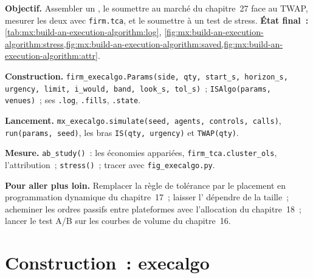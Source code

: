\begin{tutorial}
\textbf{Objectif.} Assembler un , le soumettre au marché du chapitre~27 face au TWAP, mesurer les deux avec \texttt{firm.tca},
et le soumettre à un test de stress. \textbf{État final~:} \cref{tab:mx:build-an-execution-algorithm:log},
\cref{fig:mx:build-an-execution-algorithm:stress,fig:mx:build-an-execution-algorithm:saved,fig:mx:build-an-execution-algorithm:attr}.
\begin{tutsteps}
\item \textbf{Construction.} \texttt{firm\_execalgo.Params(side, qty, start\_s, horizon\_s, urgency, limit, i\_would, band, look\_s, tol\_s)}~;
\texttt{ISAlgo(params, venues)}~; ses \texttt{.log}, \texttt{.fills}, \texttt{.state}.
\item \textbf{Lancement.} \texttt{mx\_execalgo.simulate(seed, agents, controls, calls)}, \texttt{run(params, seed)}, les bras \texttt{IS(qty, urgency)} et
\texttt{TWAP(qty)}.
\item \textbf{Mesure.} \texttt{ab\_study()}~: les économies appariées, \texttt{firm\_tca.cluster\_ols}, l'attribution~; \texttt{stress()}~; tracer avec
\texttt{fig\_execalgo.py}.
\end{tutsteps}
\textbf{Pour aller plus loin.} Remplacer la règle de tolérance par le placement en programmation dynamique du chapitre~17~; laisser l' dépendre de la taille~; acheminer
les ordres passifs entre plateformes avec l'allocation du chapitre~18~; lancer le test A/B sur les courbes de volume du chapitre~16.
\end{tutorial}

\section{Construction~: execalgo}\label{bld:mx:build-an-execution-algorithm:execalgo}

